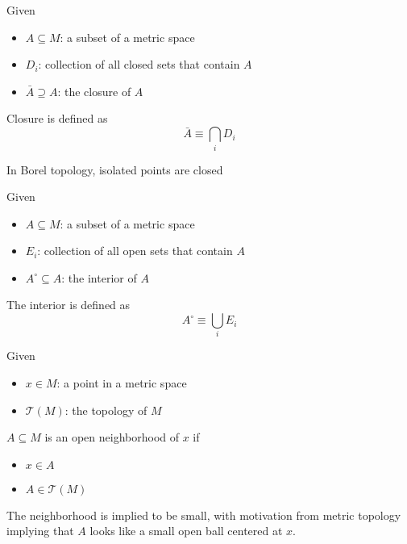 \begin{definition}

    Given
    \begin{itemize}
        \item $A \subseteq M$: a subset of a metric space
        \item ${D_i}$: collection of all closed sets that contain $A$
        \item $\bar{A} \supseteq A$: the closure of $A$
    \end{itemize}
    Closure is defined as
    \begin{equation}
        \bar{A} \equiv \bigcap_{i} D_i
    \end{equation}

    \begin{remark}
        In Borel topology, isolated points are closed
    \end{remark}
\end{definition}

\begin{definition}

    Given
    \begin{itemize}
        \item $A \subseteq M$: a subset of a metric space
        \item ${E_i}$: collection of all open sets that contain $A$
        \item $A^\circ \subseteq A$: the interior of $A$
    \end{itemize}
    The interior is defined as
    \begin{equation}
        A^\circ \equiv \bigcup_{i} E_i
    \end{equation}
    
\end{definition}

\begin{definition}

    Given
    \begin{itemize}
        \item $x \in M$: a point in a metric space
        \item $\mathcal{T}(M)$: the topology of $M$
    \end{itemize}
    $A \subseteq M$ is an open neighborhood of $x$ if
    \begin{itemize}
        \item $x \in A$
        \item $A \in \mathcal{T}(M)$
    \end{itemize}
    
    \begin{remark}
        The neighborhood is implied to be small, with motivation from metric topology implying that $A$ looks like a small open ball centered at $x$.
    \end{remark}
\end{definition}